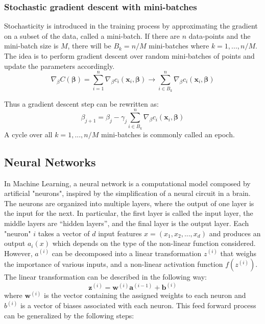\documentclass{emulateapj}
\begin{document}
\subsubsection{Stochastic gradient descent with mini-batches}
Stochasticity is introduced in the training process by approximating the gradient on a subset of the data, called a mini-batch.
If there are $n$ data-points and the mini-batch size is $M$, there will be $B_k=n/M$ mini-batches where $k=1,...,n/M$. The idea is to perform gradient descent over random mini-batches of points and update the parameters accordingly.
\begin{equation}
    \nabla_{\beta}
C(\mathbf{\beta}) = \sum_{i=1}^n \nabla_\beta c_i(\mathbf{x}_i,
\mathbf{\beta}) \rightarrow \sum_{i \in B_k}^n \nabla_\beta
c_i(\mathbf{x}_i, \mathbf{\beta})
\end{equation}

Thus a gradient descent step can be rewritten as:
\begin{equation}
 \beta_{j+1} = \beta_j - \gamma_j \sum_{i \in B_k}^n \nabla_\beta c_i(\mathbf{x}_i,
\mathbf{\beta})
\end{equation}
A cycle over all $k=1,...,n/M$ mini-batches is commonly called an epoch.
\subsection{Neural Networks}
In Machine Learning, a neural network is a computational model composed by artificial "neurons", inspired by the simplification of a neural circuit in a brain. The neurons are organized into multiple layers, where the output of one layer is the input for the next. In particular, the first layer is called the input layer, the middle layers are
“hidden layers”, and the final layer is
the output layer. Each "neuron" $i$ takes a vector of $d$ input features $x=(x_1,x_2,...,x_d)$ and produces an output $a_i(x)$ which depends on the type of the non-linear function considered. However, $a^{(i)}$ can be decomposed into a linear transformation $z^{(i)}$  that weighs the importance of various inputs, and a non-linear activation function $f(z^{(i)})$.
\\The linear transformation can be described in the following way:
\begin{equation}
\mathbf{z}^{(i)}=\mathbf{w}^{(i)}\mathbf{a}^{(i-1)}+\mathbf{b}^{(i)}
\end{equation}
where $\mathbf{w}^{(i)}$ is the vector containing the assigned weights to each neuron and $b^{(i)}$ is a vector of biases associated with each neuron. This feed forward process can be generalized by the following steps:
\end{document}
